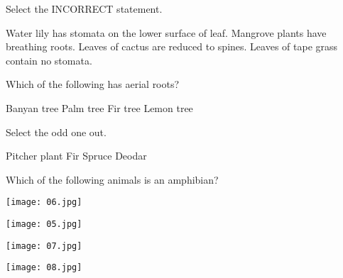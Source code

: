 


\begin{center}
\end{center}

\begin{questions}
    \question Select the INCORRECT statement.

    \begin{randomizechoices}
        \CorrectChoice Water lily has stomata on the lower surface of leaf.
        \choice Mangrove plants have breathing roots.
        \choice Leaves of cactus are reduced to spines.
        \choice Leaves of tape grass contain no stomata.
    \end{randomizechoices}

    \question Which of the following has aerial roots?

    \begin{randomizeoneparchoices}
        \CorrectChoice Banyan tree
        \choice Palm tree
        \choice Fir tree
        \choice Lemon tree
    \end{randomizeoneparchoices}
    
    \question Select the odd one out.

    \begin{randomizeoneparchoices}
        \CorrectChoice Pitcher plant
        \choice Fir
        \choice Spruce
        \choice Deodar
    \end{randomizeoneparchoices}

    \question Which of the following animals is an amphibian?

    \begin{choices}
        \begin{minipage}[t]{0.45\textwidth}
            \CorrectChoice
            \texttt{[image: 06.jpg]}
        \end{minipage}
        \begin{minipage}[t]{0.45\textwidth}
            \choice
            \texttt{[image: 05.jpg]}
        \end{minipage}
        \vspace{0.5em} %
        \begin{minipage}[t]{0.45\textwidth}
            \choice
            \texttt{[image: 07.jpg]}
        \end{minipage}
        \begin{minipage}[t]{0.45\textwidth}
            \choice
            \texttt{[image: 08.jpg]}          
        \end{minipage}
    \end{choices}


\end{questions}
